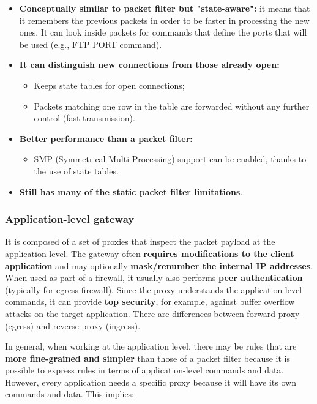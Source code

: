 \begin{itemize}
    \item \textbf{Conceptually similar to packet filter but "state-aware":} it means that it remembers the previous packets in order to be faster in processing the new ones. It can look inside packets for commands that define the ports that will be used (e.g., FTP PORT command).
    \item \textbf{It can distinguish new connections from those already open:}
          \begin{itemize}
              \item Keeps state tables for open connections;
              \item Packets matching one row in the table are forwarded without any further control (fast transmission).
          \end{itemize}
    \item \textbf{Better performance than a packet filter:}
          \begin{itemize}
              \item SMP (Symmetrical Multi-Processing) support can be enabled, thanks to the use of state tables.
          \end{itemize}
    \item \textbf{Still has many of the static packet filter limitations}.
\end{itemize}

\subsubsection{Application-level gateway}
It is composed of a set of proxies that inspect the packet payload at the application level. The gateway often \textbf{requires modifications to the client application} and may optionally \textbf{mask/renumber the internal IP addresses}. When used as part of a firewall, it usually also performs \textbf{peer authentication} (typically for egress firewall). Since the proxy understands the application-level commands, it can provide \textbf{top security}, for example, against buffer overflow attacks on the target application. There are differences between forward-proxy (egress) and reverse-proxy (ingress).

In general, when working at the application level, there may be rules that are \textbf{more fine-grained and simpler} than those of a packet filter because it is possible to express rules in terms of application-level commands and data. However, every application needs a specific proxy because it will have its own commands and data. This implies:

